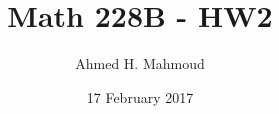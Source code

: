 \documentclass[12pt]{article}
\begin{document}
\title{Math 228B - HW2}
\author{Ahmed H. Mahmoud}
\date{17 February 2017} 

\maketitle



\newpage



\newpage







\end{document}
